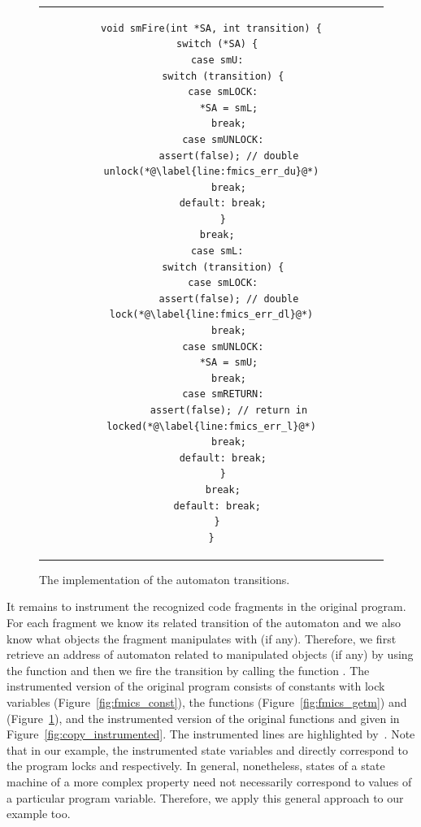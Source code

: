 \begin{figure}[htb]
  \begin{center}
  \begin{tabular}{c}
    \begin{lstlisting}[name=fmics_impl]
void smFire(int *SA, int transition) {
  switch (*SA) {
  case smU:
    switch (transition) {
    case smLOCK:
      *SA = smL;
      break;
    case smUNLOCK:
      assert(false); // double unlock(*@\label{line:fmics_err_du}@*)
      break;
    default: break;
    }
  break;
  case smL:
    switch (transition) {
    case smLOCK:
      assert(false); // double lock(*@\label{line:fmics_err_dl}@*)
      break;
    case smUNLOCK:
      *SA = smU;
      break;
    case smRETURN:
      assert(false); // return in locked(*@\label{line:fmics_err_l}@*)
      break;
    default: break;
    }
    break;
  default: break;
  }
}
    \end{lstlisting}
  \end{tabular}
  \end{center}
  \caption{The implementation of the automaton transitions.}
  \label{fig:fmics_fire}
\end{figure}

It remains to instrument the recognized code fragments in the original
program. For each fragment we know its related transition of the automaton and
we also know what objects the fragment manipulates with (if any). Therefore,
we first retrieve an address of automaton related to manipulated objects (if
any) by using the function  and then we fire the transition
by calling the function . The instrumented version of the
original program consists of constants with lock variables
(Figure~\ref{fig:fmics_const}), the functions 
(Figure~\ref{fig:fmics_getm}) and  (Figure~\ref{fig:fmics_fire}),
and the instrumented version of the original functions  and
 given in Figure~\ref{fig:copy_instrumented}. The instrumented
lines are highlighted by~\code{*}.  Note that in our example, the instrumented
state variables  and  directly correspond to the program
locks  and  respectively. In general, nonetheless, states of
a state machine of a more complex property need not necessarily correspond to
values of a particular program variable. Therefore, we apply this general
approach to our example too.

